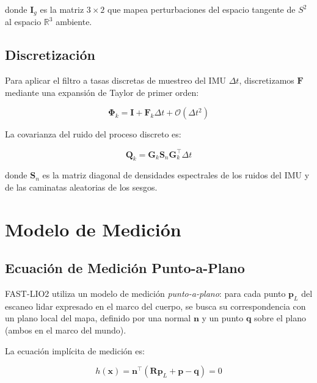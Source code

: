 donde $\mathbf{I}_g$ es la matriz $3 \times 2$ que mapea perturbaciones del
espacio tangente de $S^2$ al espacio $\mathbb{R}^3$ ambiente.

\subsection{Discretización}
\label{sec:fej-discretizacion}

Para aplicar el filtro a tasas discretas de muestreo del IMU $\Delta t$,
discretizamos $\mathbf{F}$ mediante una expansión de Taylor de primer orden:

\begin{equation}
\boldsymbol{\Phi}_k = \mathbf{I} + \mathbf{F}_k \Delta t + \mathcal{O}(\Delta t^2)
\label{eq:phi-discrete}
\end{equation}

La covarianza del ruido del proceso discreto es:

\begin{equation}
\mathbf{Q}_k = \mathbf{G}_k \mathbf{S}_n \mathbf{G}_k^\top \Delta t
\label{eq:Q-discrete}
\end{equation}

donde $\mathbf{S}_n$ es la matriz diagonal de densidades espectrales de los
ruidos del IMU y de las caminatas aleatorias de los sesgos.

\section{Modelo de Medición}
\label{sec:fej-modelo-medicion}

\subsection{Ecuación de Medición Punto-a-Plano}
\label{sec:fej-punto-plano}

FAST-LIO2 utiliza un modelo de medición \emph{punto-a-plano}: para cada punto
$\mathbf{p}_L$ del escaneo \gls{lidar} expresado en el marco del cuerpo, se
busca su correspondencia con un plano local del mapa, definido por una normal
$\mathbf{n}$ y un punto $\mathbf{q}$ sobre el plano (ambos en el marco del
mundo).

La ecuación implícita de medición es:

\begin{equation}
h(\mathbf{x}) = \mathbf{n}^\top (\mathbf{R} \mathbf{p}_L + \mathbf{p} - \mathbf{q}) = 0
\label{eq:measurement-eq}
\end{equation}

